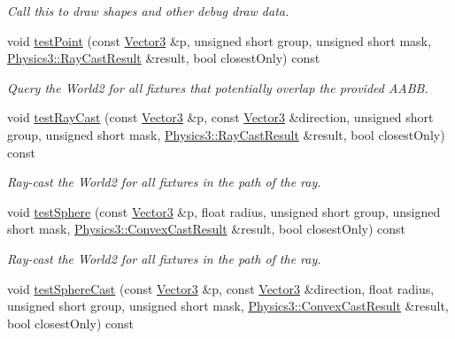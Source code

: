 \begin{DoxyCompactItemize}
\begin{DoxyCompactList}\small\item\em Call this to draw shapes and other debug draw data. \end{DoxyCompactList}\item 
void \hyperlink{class_magnum_1_1_physics3_1_1_world_a27698db9854f7fe8042f5ae15ba1ff40}{test\+Point} (const \hyperlink{class_magnum_1_1_vector3}{Vector3} \&p, unsigned short group, unsigned short mask, \hyperlink{class_magnum_1_1_physics3_1_1_ray_cast_result}{Physics3\+::\+Ray\+Cast\+Result} \&result, bool closest\+Only) const 
\begin{DoxyCompactList}\small\item\em Query the World2 for all fixtures that potentially overlap the provided A\+A\+BB. \end{DoxyCompactList}\item 
void \hyperlink{class_magnum_1_1_physics3_1_1_world_a01af519ec2b235107662dab201d3c78a}{test\+Ray\+Cast} (const \hyperlink{class_magnum_1_1_vector3}{Vector3} \&p, const \hyperlink{class_magnum_1_1_vector3}{Vector3} \&direction, unsigned short group, unsigned short mask, \hyperlink{class_magnum_1_1_physics3_1_1_ray_cast_result}{Physics3\+::\+Ray\+Cast\+Result} \&result, bool closest\+Only) const 
\begin{DoxyCompactList}\small\item\em Ray-\/cast the World2 for all fixtures in the path of the ray. \end{DoxyCompactList}\item 
void \hyperlink{class_magnum_1_1_physics3_1_1_world_a8d08af43db8b7d66112af02e894ca40e}{test\+Sphere} (const \hyperlink{class_magnum_1_1_vector3}{Vector3} \&p, float radius, unsigned short group, unsigned short mask, \hyperlink{class_magnum_1_1_physics3_1_1_convex_cast_result}{Physics3\+::\+Convex\+Cast\+Result} \&result, bool closest\+Only) const 
\begin{DoxyCompactList}\small\item\em Ray-\/cast the World2 for all fixtures in the path of the ray. \end{DoxyCompactList}\item 
void \hyperlink{class_magnum_1_1_physics3_1_1_world_ad482e19245dd876fce45f127264ab862}{test\+Sphere\+Cast} (const \hyperlink{class_magnum_1_1_vector3}{Vector3} \&p, const \hyperlink{class_magnum_1_1_vector3}{Vector3} \&direction, float radius, unsigned short group, unsigned short mask, \hyperlink{class_magnum_1_1_physics3_1_1_convex_cast_result}{Physics3\+::\+Convex\+Cast\+Result} \&result, bool closest\+Only) const 

\end{DoxyCompactItemize}
